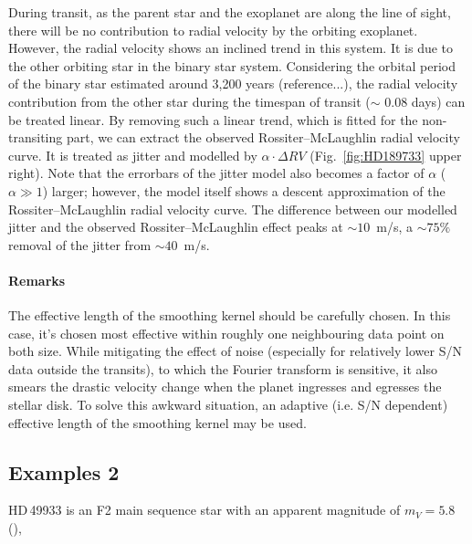 During transit, as the parent star and the exoplanet are along the line of sight, there will be no contribution to radial velocity by the orbiting exoplanet. However, the radial velocity shows an inclined trend in this system. It is due to the other orbiting star in the binary star system. Considering the orbital period of the binary star estimated around 3,200 years (reference...), the radial velocity contribution from the other star during the timespan of transit ($\sim$ 0.08 days) can be treated linear. By removing such a linear trend, which is fitted for the non-transiting part, we can extract the observed Rossiter–McLaughlin radial velocity curve. It is treated as jitter and modelled by $\alpha \cdot \Delta RV$ (Fig.~\ref{fig:HD189733} upper right). Note that the errorbars of the jitter model also becomes a factor of $\alpha$ ($\alpha\gg 1$) larger; however, the model itself shows a descent approximation of the Rossiter–McLaughlin radial velocity curve. The difference between our modelled jitter and the observed Rossiter–McLaughlin effect peaks at $\sim 10$~m/s, a $\sim75\%$ removal of the jitter from $\sim 40$~m/s. 


\paragraph{Remarks}
The effective length of the smoothing kernel should be carefully chosen. In this case, it's chosen most effective within 
roughly one neighbouring data point on both size. While mitigating the effect of noise (especially for relatively lower
S/N data outside the transits), to which the Fourier transform is sensitive, it also smears the drastic velocity 
change when the planet ingresses and egresses the stellar disk. To solve this awkward situation, an adaptive 
(i.e. S/N dependent) effective length of the smoothing kernel may be used. 
%

\subsection{Examples 2}

HD\,49933 is an F2 main sequence star with an apparent magnitude of $m_V=5.8$ (\cite{Malaroda1975}), 

